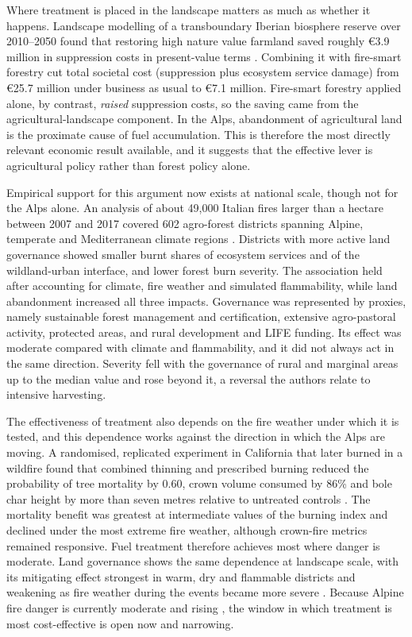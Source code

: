 \documentclass[11pt,a4paper]{article}
\begin{document}
Where treatment is placed in the landscape matters as much as whether it happens. Landscape modelling of a transboundary Iberian biosphere reserve over 2010--2050 found that restoring high nature value farmland saved roughly €3.9 million in suppression costs in present-value terms \citep{lecinadiaz_incorporating_2023}. Combining it with fire-smart forestry cut total societal cost (suppression plus ecosystem service damage) from €25.7 million under business as usual to €7.1 million. Fire-smart forestry applied alone, by contrast, \emph{raised} suppression costs, so the saving came from the agricultural-landscape component. In the Alps, abandonment of agricultural land is the proximate cause of fuel accumulation. This is therefore the most directly relevant economic result available, and it suggests that the effective lever is agricultural policy rather than forest policy alone.

Empirical support for this argument now exists at national scale, though not for the Alps alone. An analysis of about 49{,}000 Italian fires larger than a hectare between 2007 and 2017 covered 602 agro-forest districts spanning Alpine, temperate and Mediterranean climate regions \citep{spadoni_active_2023}. Districts with more active land governance showed smaller burnt shares of ecosystem services and of the wildland-urban interface, and lower forest burn severity. The association held after accounting for climate, fire weather and simulated flammability, while land abandonment increased all three impacts. Governance was represented by proxies, namely sustainable forest management and certification, extensive agro-pastoral activity, protected areas, and rural development and LIFE funding. Its effect was moderate compared with climate and flammability, and it did not always act in the same direction. Severity fell with the governance of rural and marginal areas up to the median value and rose beyond it, a reversal the authors relate to intensive harvesting.

The effectiveness of treatment also depends on the fire weather under which it is tested, and this dependence works against the direction in which the Alps are moving. A randomised, replicated experiment in California that later burned in a wildfire found that combined thinning and prescribed burning reduced the probability of tree mortality by 0.60, crown volume consumed by 86\% and bole char height by more than seven metres relative to untreated controls \citep{brodie_forest_2024}. The mortality benefit was greatest at intermediate values of the burning index and declined under the most extreme fire weather, although crown-fire metrics remained responsive. Fuel treatment therefore achieves most where danger is moderate. Land governance shows the same dependence at landscape scale, with its mitigating effect strongest in warm, dry and flammable districts and weakening as fire weather during the events became more severe \citep{spadoni_active_2023}. Because Alpine fire danger is currently moderate and rising \citep{gerberding_mapping_2025, miller_climate_2024}, the window in which treatment is most cost-effective is open now and narrowing.
\end{document}
